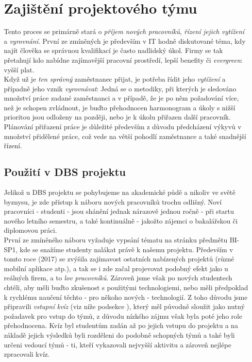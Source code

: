 
\section{Zajištění projektového týmu}

Tento proces se primárně stará o \emph{příjem nových pracovníků}, \emph{řízení jejich vytížení} a \emph{vyrovnání}. První ze zmíněných je především v IT hodně diskutované téma, kdy najít člověka se správnou kvalifikací je často nadlidský úkol. Firmy se tak přetahují kdo nabídne zajímavější pracovní prostředí, lepší benefity či \emph{evergreen}: vyšší plat.\\
Když už je \emph{ten správný} zaměstnanec přijat, je potřeba řídit jeho \emph{vytížení} a případně jeho vznik \emph{vyrovnávat}: Jedná se o metodiky, při kterých je sledováno množství práce zadané zaměstnanci a v případě, že je po něm požadování více, než je schopen zvládnout, je buďto přehodnocen harmonogram a úkoly s nižší prioritou jsou odloženy na později, nebo je k úkolu přiřazen další pracovník.\\
Plánování přiřazení práce je důležité především z důvodu předcházení výkyvů v množství přidělené práce, což vede na větší pohodlí zaměstnance a také snadnější řízení. 

\subsection{Použití v DBS projektu}
Jelikož u DBS projektu se pohybujeme na akademické půdě a nikoliv ve světě byznysu, je zde přístup k náboru nových pracovníků trochu odlišný. Noví pracovníci - studenti - jsou shánění jednak nárazově jednou ročně - při startu nového letního semestru, a také kontinuálně - jakožto zájemci o bakalářskou či diplomovou práci.\\
První ze zmíněného náboru vyžaduje vypsání tématu na stránku předmětu BI-SP1, kde se snažíme studenty nalákat právě k našemu projektu. Především v tomto roce (2017) se zvýšila zajímavost ostatních nabízených projektů (různé mobilní aplikace atp.), a tak se i zde začal projevovat podobný efekt jako u reálných firem, a to \emph{lov pracovníků}. Zároveň jsme však po nových studentech chtěli, aby měli buďto zkušenost s použitými technologiemi, nebo měli předpoklad k rychlému naučení těchto - pro někoho nových - technologií. Z toho důvodu jsme připravili \emph{vstupní kvíz} (viz níže podsekce ), který měl původně sloužit jako nutný požadavek pro vstup do týmů, z důvodu nízkého zájmu však byla poté jeho role přehodnocena. Kvíz byl studentům zadán až po jejich vstupu do projektu a na základě jejich výsledků byli rozděleni do podobně schopných týmů a také byli určeni vedoucí týmů - ti, kteří vykazovali nejvyšší aktivitu a zároveň nejlépe zpracovali kvíz.

